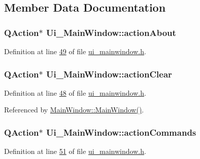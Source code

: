 \subsection{Member Data Documentation}
\hypertarget{a00080_abdf2b43167c2cd0d3405f90b8c30e934}{
\subsubsection[{action\+About}]{\setlength{\rightskip}{0pt plus 5cm}Q\+Action$\ast$ Ui\+\_\+\+Main\+Window\+::action\+About}}\label{a00080_abdf2b43167c2cd0d3405f90b8c30e934}


Definition at line \hyperlink{a00139_source_l00049}{49} of file \hyperlink{a00139_source}{ui\+\_\+mainwindow.\+h}.

\hypertarget{a00080_ac8539dcd87955047877cb256aff60453}{
\subsubsection[{action\+Clear}]{\setlength{\rightskip}{0pt plus 5cm}Q\+Action$\ast$ Ui\+\_\+\+Main\+Window\+::action\+Clear}}\label{a00080_ac8539dcd87955047877cb256aff60453}


Definition at line \hyperlink{a00139_source_l00048}{48} of file \hyperlink{a00139_source}{ui\+\_\+mainwindow.\+h}.



Referenced by \hyperlink{a00109_source_l00024}{Main\+Window\+::\+Main\+Window()}.

\hypertarget{a00080_a3dccdc21d3df68b86550093b5e3c0356}{
\subsubsection[{action\+Commands}]{\setlength{\rightskip}{0pt plus 5cm}Q\+Action$\ast$ Ui\+\_\+\+Main\+Window\+::action\+Commands}}\label{a00080_a3dccdc21d3df68b86550093b5e3c0356}


Definition at line \hyperlink{a00139_source_l00051}{51} of file \hyperlink{a00139_source}{ui\+\_\+mainwindow.\+h}.

